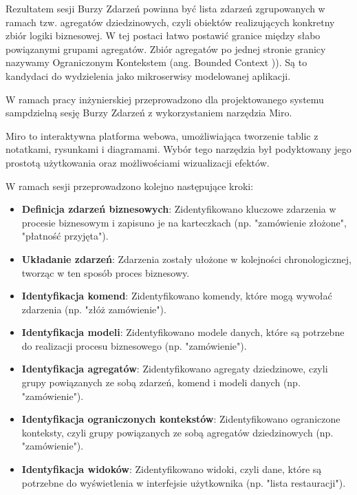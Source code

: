 Rezultatem sesji Burzy Zdarzeń powinna być lista zdarzeń zgrupowanych w ramach tzw. agregatów dziedzinowych, czyli obiektów realizujących konkretny zbiór logiki biznesowej. W tej postaci łatwo postawić granice między słabo powiązanymi grupami agregatów. Zbiór agregatów po jednej stronie granicy nazywamy Ograniczonym Kontekstem (ang. Bounded Context \cite{boundedcontext})). Są to kandydaci do wydzielenia jako mikroserwisy modelowanej aplikacji.

W ramach pracy inżynierskiej przeprowadzono dla projektowanego systemu sampdzielną sesję Burzy Zdarzeń z wykorzystaniem narzędzia Miro.

Miro \cite{miro} to interaktywna platforma webowa, umożliwiająca tworzenie tablic z notatkami, rysunkami i diagramami. Wybór tego narzędzia był podyktowany jego prostotą użytkowania oraz możliwościami wizualizacji efektów.

W ramach sesji przeprowadzono kolejno następujące kroki:

\begin{itemize}

    \item \textbf{Definicja zdarzeń biznesowych}: Zidentyfikowano kluczowe zdarzenia w procesie biznesowym i zapisuno je na karteczkach (np. "zamówienie złożone", "płatność przyjęta").
    \item \textbf{Układanie zdarzeń}: Zdarzenia zostały ułożone w kolejności chronologicznej, tworząc w ten sposób proces biznesowy.
    \item \textbf{Identyfikacja komend}: Zidentyfikowano komendy, które mogą wywołać zdarzenia (np. "złóż zamówienie").
    \item \textbf{Identyfikacja modeli}: Zidentyfikowano modele danych, które są potrzebne do realizacji procesu biznesowego (np. "zamówienie").
    \item \textbf{Identyfikacja agregatów}: Zidentyfikowano agregaty dziedzinowe, czyli grupy powiązanych ze sobą zdarzeń, komend i modeli danych (np. "zamówienie").
    \item \textbf{Identyfikacja ograniczonych kontekstów}: Zidentyfikowano ograniczone konteksty, czyli grupy powiązanych ze sobą agregatów dziedzinowych (np. "zamówienie").
    \item \textbf{Identyfikacja widoków}: Zidentyfikowano widoki, czyli dane, które są potrzebne do wyświetlenia w interfejsie użytkownika (np. "lista restauracji").

\end{itemize}

